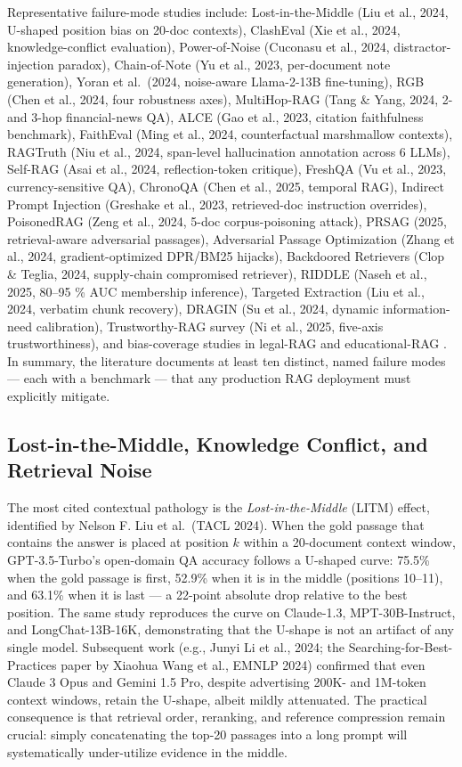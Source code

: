 \documentclass{article}
\begin{document}
Representative failure-mode studies include: Lost-in-the-Middle (Liu et al., 2024, U-shaped position bias on 20-doc contexts), ClashEval (Xie et al., 2024, knowledge-conflict evaluation), Power-of-Noise (Cuconasu et al., 2024, distractor-injection paradox), Chain-of-Note (Yu et al., 2023, per-document note generation), Yoran et al.~(2024, noise-aware Llama-2-13B fine-tuning), RGB (Chen et al., 2024, four robustness axes), MultiHop-RAG (Tang \& Yang, 2024, 2- and 3-hop financial-news QA), ALCE (Gao et al., 2023, citation faithfulness benchmark), FaithEval (Ming et al., 2024, counterfactual marshmallow contexts), RAGTruth (Niu et al., 2024, span-level hallucination annotation across 6 LLMs), Self-RAG (Asai et al., 2024, reflection-token critique), FreshQA (Vu et al., 2023, currency-sensitive QA), ChronoQA (Chen et al., 2025, temporal RAG), Indirect Prompt Injection (Greshake et al., 2023, retrieved-doc instruction overrides), PoisonedRAG (Zeng et al., 2024, 5-doc corpus-poisoning attack), PRSAG (2025, retrieval-aware adversarial passages), Adversarial Passage Optimization (Zhang et al., 2024, gradient-optimized DPR/BM25 hijacks), Backdoored Retrievers (Clop \& Teglia, 2024, supply-chain compromised retriever), RIDDLE (Naseh et al., 2025, 80--95 \% AUC membership inference), Targeted Extraction (Liu et al., 2024, verbatim chunk recovery), DRAGIN (Su et al., 2024, dynamic information-need calibration), Trustworthy-RAG survey (Ni et al., 2025, five-axis trustworthiness), and bias-coverage studies in legal-RAG \citep{hindi20252025} and educational-RAG \citep{li20252025}. In summary, the literature documents at least ten distinct, named failure modes --- each with a benchmark --- that any production RAG deployment must explicitly mitigate.

\subsection{Lost-in-the-Middle, Knowledge Conflict, and Retrieval Noise}\label{lost-in-the-middle-knowledge-conflict-and-retrieval-noise}

The most cited contextual pathology is the \emph{Lost-in-the-Middle} (LITM) effect, identified by Nelson F. Liu et al.~(TACL 2024). When the gold passage that contains the answer is placed at position \(k\) within a 20-document context window, GPT-3.5-Turbo's open-domain QA accuracy follows a U-shaped curve: 75.5\% when the gold passage is first, 52.9\% when it is in the middle (positions 10--11), and 63.1\% when it is last --- a 22-point absolute drop relative to the best position. The same study reproduces the curve on Claude-1.3, MPT-30B-Instruct, and LongChat-13B-16K, demonstrating that the U-shape is not an artifact of any single model. Subsequent work (e.g., Junyi Li et al., 2024; the Searching-for-Best-Practices paper by Xiaohua Wang et al., EMNLP 2024) confirmed that even Claude 3 Opus and Gemini 1.5 Pro, despite advertising 200K- and 1M-token context windows, retain the U-shape, albeit mildly attenuated. The practical consequence is that retrieval order, reranking, and reference compression remain crucial: simply concatenating the top-20 passages into a long prompt will systematically under-utilize evidence in the middle.
\end{document}

